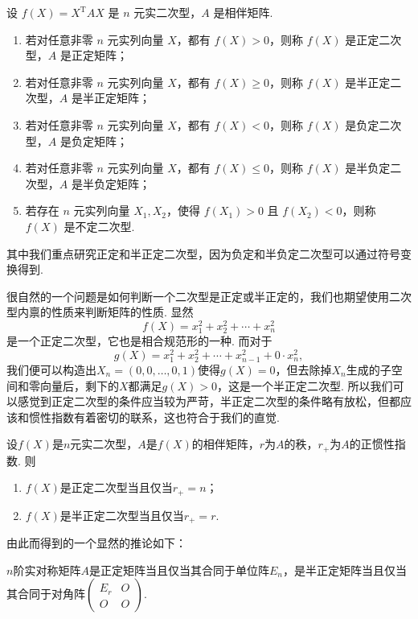 \begin{definition}{}{}
    设 $f(X) = X^\mathrm{T}AX$ 是 $n$ 元实二次型，$A$ 是相伴矩阵.
    \begin{enumerate}
        \item 若对任意非零 $n$ 元实列向量 $X$，都有 $f(X) > 0$，则称 $f(X)$ 是正定二次型，$A$ 是正定矩阵；
        \item 若对任意非零 $n$ 元实列向量 $X$，都有 $f(X) \geqslant 0$，则称 $f(X)$ 是半正定二次型，$A$ 是半正定矩阵；
        \item 若对任意非零 $n$ 元实列向量 $X$，都有 $f(X) < 0$，则称 $f(X)$ 是负定二次型，$A$ 是负定矩阵；
        \item 若对任意非零 $n$ 元实列向量 $X$，都有 $f(X) \leqslant 0$，则称 $f(X)$ 是半负定二次型，$A$ 是半负定矩阵；
        \item 若存在 $n$ 元实列向量 $X_1, X_2$，使得 $f(X_1) > 0$ 且 $f(X_2) < 0$，则称 $f(X)$ 是不定二次型.
    \end{enumerate}
\end{definition}

其中我们重点研究正定和半正定二次型，因为负定和半负定二次型可以通过符号变换得到.

很自然的一个问题是如何判断一个二次型是正定或半正定的，我们也期望使用二次型内禀的性质来判断矩阵的性质. 显然
\[f(X) = x_1^2 + x_2^2 + \cdots + x_n^2\]
是一个正定二次型，它也是相合规范形的一种. 而对于
\[g(X) = x_1^2 + x_2^2 + \cdots + x_{n - 1}^2 + 0 \cdot x_n^2,\]
我们便可以构造出$X_n=(0, 0, \ldots, 0, 1)$使得$g(X)=0$，但去除掉$X_n$生成的子空间和零向量后，剩下的$X$都满足$g(X) > 0$，这是一个半正定二次型. 所以我们可以感觉到正定二次型的条件应当较为严苛，半正定二次型的条件略有放松，但都应该和惯性指数有着密切的联系，这也符合于我们的直觉.

\begin{theorem}{}{}
    设$f(X)$是$n$元实二次型，$A$是$f(X)$的相伴矩阵，$r$为$A$的秩，$r_+$为$A$的正惯性指数. 则
    \begin{enumerate}
        \item $f(X)$是正定二次型当且仅当$r_+=n$；
        \item $f(X)$是半正定二次型当且仅当$r_+=r$.
    \end{enumerate}
\end{theorem}

由此而得到的一个显然的推论如下：

\begin{corollary}{}{}
    $n$阶实对称矩阵$A$是正定矩阵当且仅当其合同于单位阵$E_n$，是半正定矩阵当且仅当其合同于对角阵$\begin{pmatrix}
        E_r & O \\ O & O
    \end{pmatrix}$.
\end{corollary}

